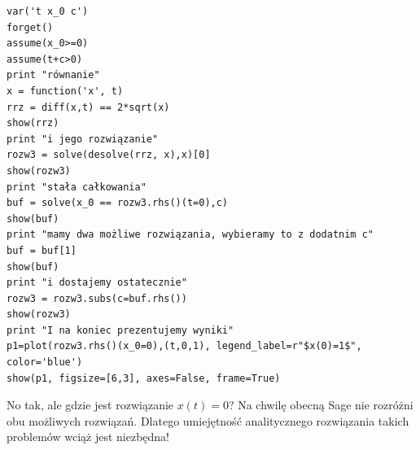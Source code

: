 \documentclass[a4paper,12pt,polish]{sphinxmanual}
\begin{document}
\begin{verbatim}
var('t x_0 c')
forget()
assume(x_0>=0)
assume(t+c>0)
print "równanie"
x = function('x', t)
rrz = diff(x,t) == 2*sqrt(x)
show(rrz)
print "i jego rozwiązanie"
rozw3 = solve(desolve(rrz, x),x)[0]
show(rozw3)
print "stała całkowania"
buf = solve(x_0 == rozw3.rhs()(t=0),c)
show(buf)
print "mamy dwa możliwe rozwiązania, wybieramy to z dodatnim c"
buf = buf[1]
show(buf)
print "i dostajemy ostatecznie"
rozw3 = rozw3.subs(c=buf.rhs())
show(rozw3)
print "I na koniec prezentujemy wyniki"
p1=plot(rozw3.rhs()(x_0=0),(t,0,1), legend_label=r"$x(0)=1$", color='blue')
show(p1, figsize=[6,3], axes=False, frame=True)
\end{verbatim}


No tak, ale gdzie jest rozwiązanie $x(t) = 0$? Na chwilę obecną Sage nie rozróżni obu możliwych rozwiązań. Dlatego umiejętność analitycznego rozwiązania takich problemów wciąż jest niezbędna!
\end{document}
